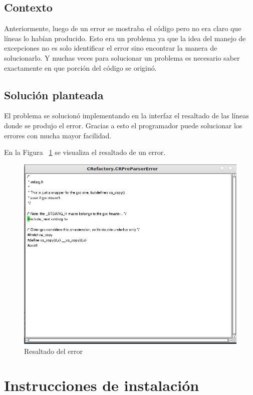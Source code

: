 \documentclass[a4paper,oneside,12pt]{article}
\begin{document}
\subsection{Contexto}
Anteriormente, luego de un error se mostraba el c\'odigo pero no era claro que l\'ineas lo hab\'ian producido. Esto era un problema ya que la idea del manejo de excepciones no es solo identificar el error sino encontrar la manera de solucionarlo. Y muchas veces para solucionar un problema es necesario saber exactamente en que porci\'on del c\'odigo se origin\'o.

\subsection{Soluci\'on planteada}
El problema se solucion\'o implementando en la interfaz el resaltado de las l\'ineas donde se produjo el error. Gracias a esto el programador puede solucionar los errores con mucha mayor facilidad.

En la Figura ~\ref{resaltado} se visualiza el resaltado de un error.
\begin{figure}[h!]
  \centering
    \includegraphics[scale=0.50]{images/codigo_modificado/highlight_preparser.jpg}
     \caption{Resaltado del error}
     \label{resaltado}
\end{figure}


\section{Instrucciones de instalaci\'on}
\end{document}
